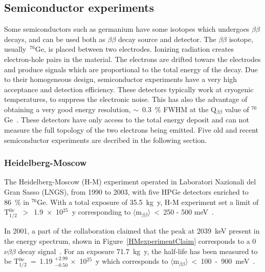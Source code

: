\documentclass[main.tex]{subfiles}
\begin{document}
\subsection{Semiconductor experiments}


\NI Some semiconductors such as germanium have some isotopes which undergoes $\beta\beta$ decays, and can be used both as $\beta\beta$ decay source and detector. The $\beta\beta$ isotope, usually~$^{\text{76}}$Ge, is placed between two electrodes. Ionizing radiation creates electron-hole pairs in the material. The electrons are drifted towars the electrodes and produce signals which are proportional to the total energy of the decay. Due to their homogeneous design, semiconductor experiments have a very high acceptance and detection efficiency. These detectors typically work at cryogenic temperatures, to suppress the electronic noise. This has also the advantage of obtaining a very good energy resolution, $\sim$~0.3~\% FWHM at the Q$_{\beta\beta}$ value of $^{\text{76}}$Ge~\cite{QbetabetaGe}. %
These detectors have only access to the total energy deposit and can not measure the full topology of the two electrons being emitted. Five old and recent semiconductor experiments are decribed in the following section.


\subsubsection{Heidelberg-Moscow}


\NI The Heidelberg-Moscow (H-M) experiment operated in Laboratori Nazionali del Gran Sasso (LNGS), from 1990 to 2003, with five HPGe detectors enriched to 86~\% in $^{\text{76}}$Ge. With a total exposure of 35.5~kg~y, H-M experiment set a limit of T$_{\text{1/2}}^{0\nu}$~$>$~1.9~$\times$~10$^{\text{25}}$~y corresponding to $\langle \text{m}_{\beta\beta} \rangle$~<~250 - 500 meV~\cite{HeidelbergMoscow1}.


\bigskip


\NI In 2001, a part of the collaboration claimed that the peak at 2039~keV present in the energy spectrum, shown in Figure~\ref{HMexperimentClaim} corresponds to a 0$\nu\beta\beta$ decay signal~\cite{HeidelbergMoscow2}. For an exposure 71.7~kg~y, the half-life has been measured to be T$_{\text{1/2}}^{0\nu}$~=~1.19 $^{\text{+2.99}}_{-\text{0.50}}$ $\times$~10$^{\text{25}}$~y which corresponds to $\langle \text{m}_{\beta\beta} \rangle$~<~100~-~900~meV~\cite{HeidelbergMoscow2}.
\end{document}
